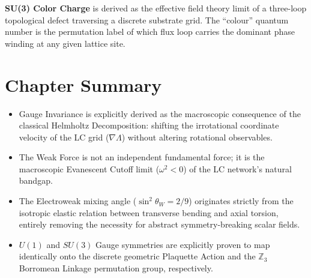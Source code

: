 \textbf{SU(3) Color Charge} is derived as the effective field theory limit of a three-loop topological defect traversing a discrete substrate grid. The ``colour'' quantum number is the permutation label of which flux loop carries the dominant phase winding at any given lattice site.

\section*{Chapter Summary}
\begin{itemize}
    \item Gauge Invariance is explicitly derived as the macroscopic consequence of the classical Helmholtz Decomposition: shifting the irrotational coordinate velocity of the LC grid ($\nabla \Lambda$) without altering rotational observables.
    \item The Weak Force is not an independent fundamental force; it is the macroscopic Evanescent Cutoff limit ($\omega^2 < 0$) of the LC network's natural bandgap.
    \item The Electroweak mixing angle ($\sin^2\theta_W = 2/9$) originates strictly from the isotropic elastic relation between transverse bending and axial torsion, entirely removing the necessity for abstract symmetry-breaking scalar fields.
    \item $U(1)$ and $SU(3)$ Gauge symmetries are explicitly proven to map identically onto the discrete geometric Plaquette Action and the $\mathbb{Z}_3$ Borromean Linkage permutation group, respectively.
\end{itemize}

